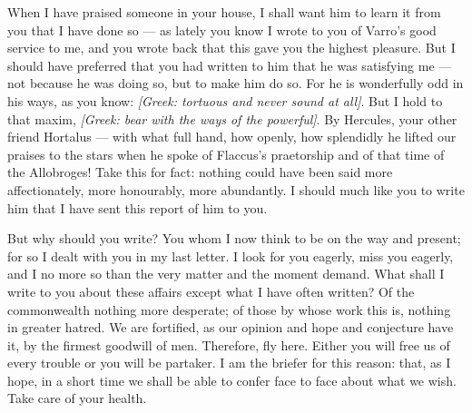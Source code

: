 

 When I have praised someone in your house, I shall want him to learn it from you that I have done so --- as lately you know I wrote to you of Varro's good service to me, and you wrote back that this gave you the highest pleasure. But I should have preferred that you had written to him that he was satisfying me --- not because he was doing so, but to make him do so. For he is wonderfully odd in his ways, as you know: \textit{[Greek: tortuous and never sound at all]}. But I hold to that maxim, \textit{[Greek: bear with the ways of the powerful]}. By Hercules, your other friend Hortalus --- with what full hand, how openly, how splendidly he lifted our praises to the stars when he spoke of Flaccus's praetorship and of that time of the Allobroges! Take this for fact: nothing could have been said more affectionately, more honourably, more abundantly. I should much like you to write him that I have sent this report of him to you.

 But why should you write? You whom I now think to be on the way and present; for so I dealt with you in my last letter. I look for you eagerly, miss you eagerly, and I no more so than the very matter and the moment demand. What shall I write to you about these affairs except what I have often written? Of the commonwealth nothing more desperate; of those by whose work this is, nothing in greater hatred. We are fortified, as our opinion and hope and conjecture have it, by the firmest goodwill of men. Therefore, fly here. Either you will free us of every trouble or you will be partaker. I am the briefer for this reason: that, as I hope, in a short time we shall be able to confer face to face about what we wish. Take care of your health.
